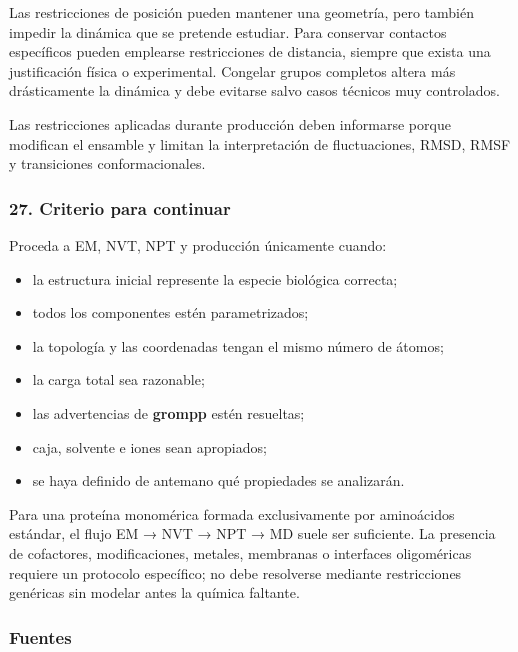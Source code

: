 \documentclass[
  spanish,
  11pt,
  a4paper]{article}
\providecommand{\tightlist}{%
  \setlength{\itemsep}{0pt}\setlength{\parskip}{0pt}}
\begin{document}
Las restricciones de posición pueden mantener una geometría, pero
también impedir la dinámica que se pretende estudiar. Para conservar
contactos específicos pueden emplearse restricciones de distancia,
siempre que exista una justificación física o experimental. Congelar
grupos completos altera más drásticamente la dinámica y debe evitarse
salvo casos técnicos muy controlados.

Las restricciones aplicadas durante producción deben informarse porque
modifican el ensamble y limitan la interpretación de fluctuaciones,
RMSD, RMSF y transiciones conformacionales.

\subsubsection{27. Criterio para
continuar}\label{criterio-para-continuar}

Proceda a EM, NVT, NPT y producción únicamente cuando:

\begin{itemize}
\tightlist
\item
  la estructura inicial represente la especie biológica correcta;
\item
  todos los componentes estén parametrizados;
\item
  la topología y las coordenadas tengan el mismo número de átomos;
\item
  la carga total sea razonable;
\item
  las advertencias de \textbf{grompp} estén resueltas;
\item
  caja, solvente e iones sean apropiados;
\item
  se haya definido de antemano qué propiedades se analizarán.
\end{itemize}

Para una proteína monomérica formada exclusivamente por aminoácidos
estándar, el flujo EM → NVT → NPT → MD suele ser suficiente. La
presencia de cofactores, modificaciones, metales, membranas o interfaces
oligoméricas requiere un protocolo específico; no debe resolverse
mediante restricciones genéricas sin modelar antes la química faltante.

\subsubsection{Fuentes}\label{fuentes-2}
\end{document}
